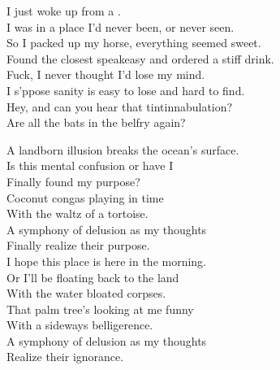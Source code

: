 
\label{album:phantom-island}





I just woke up from a . \\
I was in a place I'd never been, or never seen. \\
So I packed up my horse, everything seemed sweet. \\
Found the closest speakeasy and ordered a stiff drink. \\

Fuck, I never thought I'd lose my mind. \\
I s'ppose sanity is easy to lose and hard to find. \\
Hey, and can you hear that tintinnabulation? \\
Are all the bats in the belfry again? \\


A landborn illusion breaks the ocean's surface. \\
Is this mental confusion or have I \\
Finally found my purpose? \\
Coconut congas playing in time \\
With the waltz of a tortoise. \\
A symphony of delusion as my thoughts \\
Finally realize their purpose. \\

I hope this place is here in the morning. \\
Or I'll be floating back to the land \\
With the water bloated corpses. \\
That palm tree's looking at me funny \\
With a sideways belligerence. \\
A symphony of delusion as my thoughts \\
Realize their ignorance. \\


